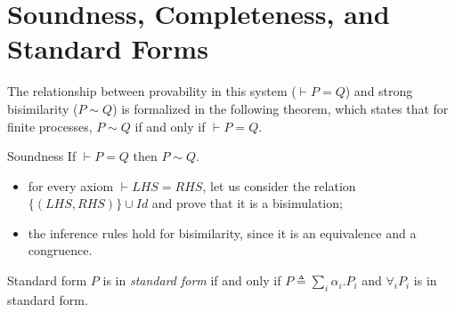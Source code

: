 \section{Soundness, Completeness, and Standard Forms}
The relationship between provability in this system ($\vdash P=Q$) and strong bisimilarity ($P\sim Q$) is formalized in the following theorem, which states that for finite processes, $P\sim Q$ if and only if $\vdash P=Q$.

\begin{Thm}{Soundness}{}
    If $\vdash P = Q$ then $P\sim Q$.
    \begin{demonstration}\phantom{}
    \begin{itemize}
        \item for every axiom $\vdash LHS = RHS$, let us consider the relation $\{(LHS, RHS)\} \cup Id$ and prove that it is a bisimulation;
        \item the inference rules hold for bisimilarity, since it is an equivalence and a congruence.
    \end{itemize}
    \end{demonstration}
\end{Thm}

\begin{Definition}{Standard form}{}
    $P$ is in \textit{standard form} if and only if $P\triangleq \sum_i\alpha_i.P_i$ and $\forall_iP_i$ is in standard form.
\end{Definition}

